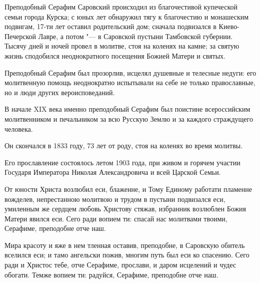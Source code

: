 \begin{mymulticols}


Преподобный Серафим Саровский происходил из благочестивой купеческой семьи города Курска; с юных лет обнаружил тягу к благочестию и монашеским подвигам, 17-ти лет оставил родительский дом; сначала подвизался в Киево-Печерской Лавре, а потом "--- в Саровской пустыни Тамбовской губернии. Тысячу дней и ночей провел в молитве, стоя на коленях на камне; за святую жизнь сподобился неоднократного посещения Божией Матери и святых.


Преподобный Серафим был прозорлив, исцелял душевные и телесные недуги: его молитвенную помощь неоднократно испытывали на себе не только православные, но и люди других вероисповеданий.


В начале XIX века именно преподобный Серафим был поистине всероссийским молитвенником и печальником за всю Русскую Землю и за каждого страждущего человека.


Он скончался в 1833 году, 73 лет от роду, стоя на коленях во время молитвы.


Его прославление состоялось летом 1903 года, при живом и горячем участии Государя Императора Николая Александровича и всей Царской Семьи.




От юности Христа возлюбил еси, блаженне, и Тому Единому работати пламенне вожделев, непрестанною молитвою и трудом в пустыни подвизался еси, умиленным же сердцем любовь Христову стяжав, избранник возлюблен Божия Матери явился еси. Сего ради вопием ти: спасай нас молитвами твоими, Серафиме, преподобне отче наш.





Мира красоту и яже в нем тленная оставив, преподобне, в Саровскую обитель вселился еси; и тамо ангельски пожив, многим путь был еси ко спасению. Сего ради и Христос тебе, отче Серафиме, прослави, и даром исцелений и чудес обогати. Темже вопием ти: радуйся, Серафиме, преподобне отче наш.





\end{mymulticols}
